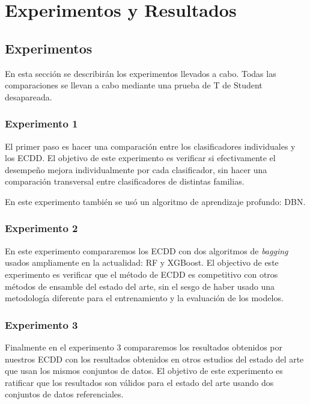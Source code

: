 \chapter{Experimentos y Resultados}


\section{Experimentos}

En esta sección se describirán los experimentos llevados a cabo. Todas las comparaciones se llevan a cabo mediante una prueba de T de Student desapareada.

\subsection{Experimento 1}

El primer paso es hacer una comparación entre los clasificadores individuales y los \ac{ECDD}. El objetivo de este experimento es verificar si efectivamente el desempeño mejora individualmente por cada clasificador, sin hacer una comparación transversal entre clasificadores de distintas familias.

En este experimento también se usó un algoritmo de aprendizaje profundo: \ac{DBN}.

\subsection{Experimento 2}

En este experimento compararemos los \ac{ECDD} con dos algoritmos de \textit{bagging} usados ampliamente en la actualidad: \ac{RF} y \ac{XGBoost}. El objectivo de este experimento es verificar que el método de \ac{ECDD} es competitivo con otros métodos de ensamble del estado del arte, sin el sesgo de haber usado una metodología diferente para el entrenamiento y la evaluación de los modelos.

\subsection{Experimento 3}

Finalmente en el experimento 3 compararemos los resultados obtenidos por nuestros \ac{ECDD} con los resultados obtenidos en otros estudios del estado del arte que usan los mismos conjuntos de datos. El objetivo de este experimento es ratificar que los resultados son válidos para el estado del arte usando dos conjuntos de datos referenciales.


